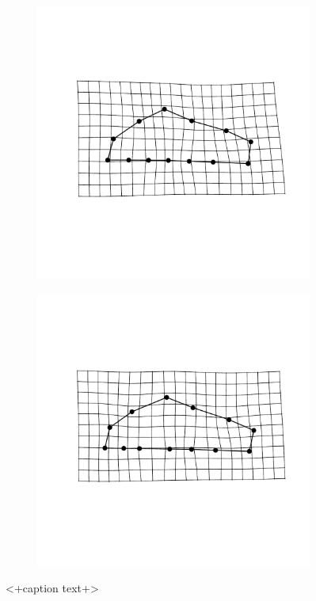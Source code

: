 \documentclass[12pt,letterpaper]{article}\usepackage{graphicx, color}
\begin{document}
\begin{figure}[ht]
  \begin{subfigure}[b]{0.4\textwidth}
    \centering
    \includegraphics[width = \textwidth]{figure/mshape_3}
    \label{fig:mean_shape3}
  \end{subfigure}
  \begin{subfigure}[b]{0.4\textwidth}
    \centering
    \includegraphics[width = \textwidth]{figure/mshape_4}
    \label{fig:mean_shape4}
  \end{subfigure}
  \caption{<+caption text+>}
  \label{fig:mean_shape}
\end{figure}
\end{document}
